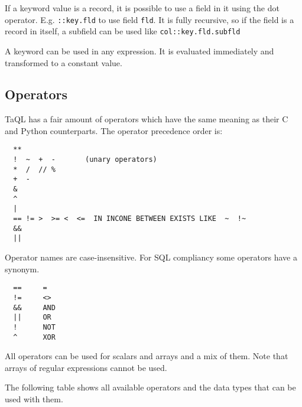 If a keyword value is a record, it is possible to use
a field in it using the dot operator. E.g. \texttt{::key.fld}
to use field \texttt{fld}. It is fully recursive, so if the
field is a record in itself, a subfield can be used like
\texttt{col::key.fld.subfld}

A keyword can be used in any expression. It is evaluated immediately
and transformed to a constant value.

\subsection{\label{TAQL:OPERATORS}Operators}
TaQL has a fair amount of operators which have the same meaning as
their C and Python counterparts.
The operator precedence order is:
\begin{verbatim}
  **
  !  ~  +  -       (unary operators)
  *  /  // %
  +  -
  &
  ^
  |
  == != >  >= <  <=  IN INCONE BETWEEN EXISTS LIKE  ~  !~
  &&
  ||
\end{verbatim}
Operator names are case-insensitive.
For SQL compliancy some operators have a synonym.
\begin{verbatim}
  ==     =
  !=     <>
  &&     AND
  ||     OR
  !      NOT
  ^      XOR
\end{verbatim}
All operators can be used for scalars and arrays and a mix of them.
Note that arrays of regular expressions cannot be used.

The following table shows all available operators and the data types
that can be used with them.

